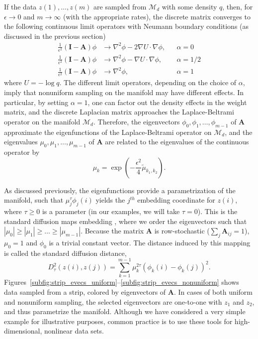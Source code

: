 \documentclass[3p]{elsarticle}
\begin{document}
If the data $z(1), \dots, z(m)$ are sampled from $\mathcal{M}_d$ with some density $q$, then, for $\epsilon \rightarrow 0$ and $m \rightarrow \infty$ (with the appropriate rates), the discrete matrix converges to the following continuous limit operators with Neumann boundary conditions (as discussed in the previous section) \cite{coifman2006geometric}
\begin{align}
\frac{1}{\epsilon^2}(\mathbf{I}-\mathbf{A}) \phi &\rightarrow \nabla^2 \phi - 2\nabla U \cdot \nabla \phi, &&\alpha = 0 \\
\frac{1}{\epsilon^2}(\mathbf{I}-\mathbf{A}) \phi &\rightarrow \nabla^2 \phi - \nabla U \cdot \nabla \phi, &&\alpha = 1/2 \\
\frac{1}{\epsilon^2}(\mathbf{I}-\mathbf{A}) \phi &\rightarrow \nabla^2 \phi, &&\alpha = 1
\end{align}
where $U = - \log q$.
%
The different limit operators, depending on the choice of $\alpha$, imply that nonuniform
sampling on the manifold may have different effects.
%
In particular, by setting $\alpha=1$, one can factor out the density effects in the
weight matrix, and the discrete Laplacian matrix approaches the Laplace-Beltrami operator on the manifold $\mathcal{M}_d$.
%
Therefore, the eigenvectors $\phi_0, \phi_1, \dots, \phi_{m-1}$ of $\mathbf{A}$ approximate the eigenfunctions of the Laplace-Beltrami operator on $\mathcal{M}_d$,
and the eigenvalues $\mu_0, \mu_1, \dots, \mu_{m-1}$ of $\mathbf{A}$ are related to the eigenvalues of the continuous operator by
\begin{equation} \label{eq:evals_relationship}
\mu_k = \exp \left( -\frac{\epsilon^2}{4} \tilde{\mu}_{k_1, k_2}  \right).
\end{equation}

As discussed previously, the eigenfunctions provide a parametrization of the manifold,
such that $\mu_j^\tau \phi_{j}(i)$ yields the $j^{th}$ embedding coordinate for $z(i)$, where $\tau \ge 0$ is
a parameter (in our examples, we will take $\tau=0$).
%
This is the standard diffusion maps embedding \cite{coifman2005geometric, coifman2006geometric}, where
we order the eigenvectors such that $|\mu_0| \ge |\mu_1| \ge \dots \ge |\mu_{m-1}|$.
%
Because the matrix $\mathbf{A}$ is row-stochastic ($\sum_j \mathbf{A}_{ij} = 1$),  $\mu_0 = 1$ and $\phi_0$ is a trivial constant vector.
%
The distance induced by this mapping is called the standard diffusion distance,
%
\begin{equation}
D^2_\tau(z(i), z(j)) = \sum_{k=1}^{m-1} \mu_k^{2 \tau} \left( \phi_k(i) - \phi_k(j)  \right)^2.
\end{equation}
%
Figures~\ref{subfig:strip_evecs_uniform}--\ref{subfig:strip_evecs_nonuniform} shows
data sampled from a strip, colored by eigenvectors of $\mathbf{A}$.
%
In cases of both uniform and nonuniform sampling, the selected eigenvectors are one-to-one with $z_1$ and $z_2$,
and thus parametrize the manifold.
%
%
Although we have considered a very simple example for illustrative purposes, common practice is to use these tools for high-dimensional, nonlinear data sets.
\end{document}
